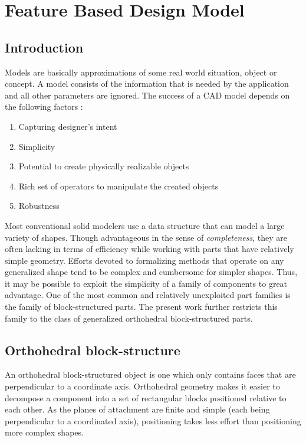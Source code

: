 \chapter{Feature Based Design Model}


	\section{Introduction}

	Models are basically approximations of some real world situation, object or
	concept. A model consists of the information that is needed by the 
	application and all other parameters are ignored. The success of a CAD 
	model depends on the following factors :

	\begin{enumerate}
	\item
	Capturing designer's intent
	\item
	Simplicity
	\item
	Potential to create physically realizable objects 
	\item
	Rich set of operators to manipulate the created objects
	\item
	Robustness
	\end{enumerate}

	Most conventional solid modelers use a data structure that can model a 
	large variety of shapes. Though advantageous in the sense of 
	{\em completeness}, they are often lacking in terms of efficiency while 
	working with parts that have relatively simple geometry. 
	Efforts devoted to formalizing methods that operate on any generalized 
	shape tend to be complex and cumbersome for simpler shapes. 
	Thus, it may be possible to exploit the simplicity of a family of 
	components to great advantage. One of the most common and relatively 
	unexploited part families is the family of block-structured parts. 
	The present work further restricts this family to the class of
	generalized orthohedral block-structured parts.


	\section{Orthohedral block-structure}

	An orthohedral block-structured object is one which only contains faces
	that are perpendicular to a coordinate axis. Orthohedral geometry makes
	it easier to decompose a component into a set of rectangular blocks 
	positioned
	relative to each other. As the planes of attachment are finite and
	simple (each being perpendicular to a coordinated axis), positioning takes 
	less effort than positioning more complex shapes.


